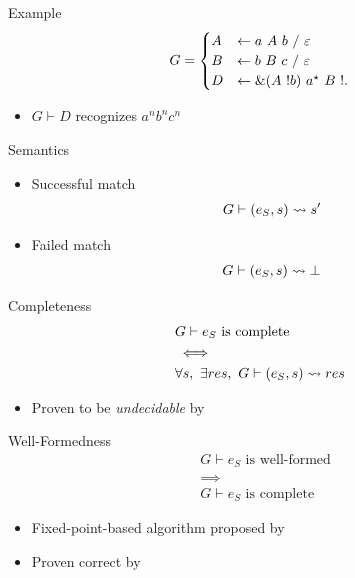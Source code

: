 \documentclass{beamer}
\begin{document}
\begin{frame}{Example}
    \begin{align*}
        G = \begin{cases}
            A& \leftarrow a\ A\ b\ /\ \varepsilon \\
            B& \leftarrow b\ B\ c\ /\ \varepsilon \\
            D& \leftarrow \&(A\ !b)\ a^\star\ B\ !.{}
        \end{cases}
    \end{align*}
    \begin{itemize}
        \item $G \vdash D$ recognizes $a^n b^n c^n$
    \end{itemize}
\end{frame}

\begin{frame}{Semantics}
    \begin{itemize}
        \item Successful match
        \begin{align*}
            G \vdash (e_S, s) \rightsquigarrow s'
        \end{align*}
        \item Failed match
        \begin{align*}
            G \vdash (e_S, s) \rightsquigarrow \bot
        \end{align*}
    \end{itemize}
\end{frame}

\begin{frame}{Completeness}
    \begin{align*}
        & \text{$G \vdash e_S$ is complete} \\
        & \iff \\
        & \forall s,\ \exists res,\ G \vdash (e_S, s) \rightsquigarrow res
    \end{align*}
    \begin{itemize}
        \item Proven to be \emph{undecidable} by \citeauthor{ford_parsing_2004}
    \end{itemize}
\end{frame}

\begin{frame}{Well-Formedness}
    \begin{align*}
        & \text{$G \vdash e_S$ is well-formed} \\
        & \implies \\
        & \text{$G \vdash e_S$ is complete}
    \end{align*}
    \begin{itemize}
        \item Fixed-point-based algorithm proposed by \cite{ford_parsing_2004}
        \item Proven correct by \cite{koprowski_trx_2011}
    \end{itemize}
\end{frame}
\end{document}
